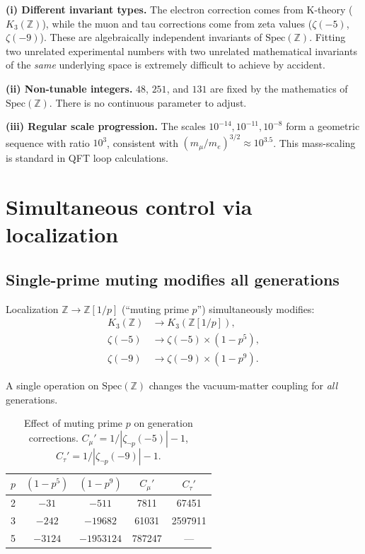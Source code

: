 \documentclass[11pt,a4paper]{article}
\newcommand{\Spec}{\mathrm{Spec}}
\begin{document}
\textbf{(i) Different invariant types.} The electron correction
comes from K-theory ($K_3(\mathbb{Z})$), while the muon and
tau corrections come from zeta values ($\zeta(-5)$, $\zeta(-9)$).
These are algebraically independent invariants of $\Spec(\mathbb{Z})$.
Fitting two unrelated experimental numbers with two unrelated
mathematical invariants of the \emph{same} underlying space is
extremely difficult to achieve by accident.

\textbf{(ii) Non-tunable integers.} $48$, $251$, and $131$ are
fixed by the mathematics of $\Spec(\mathbb{Z})$. There is no
continuous parameter to adjust.

\textbf{(iii) Regular scale progression.} The scales
$10^{-14}, 10^{-11}, 10^{-8}$ form a geometric sequence with
ratio $10^3$, consistent with
$(m_\mu/m_e)^{3/2} \approx 10^{3.5}$.
This mass-scaling is standard in QFT loop calculations.

\section{Simultaneous control via localization}
\label{sec:localization}

\subsection{Single-prime muting modifies all generations}

Localization $\mathbb{Z} \to \mathbb{Z}[1/p]$
(``muting prime $p$'') simultaneously modifies:
\begin{align}
  K_3(\mathbb{Z}) &\to K_3(\mathbb{Z}[1/p]), \\
  \zeta(-5) &\to \zeta(-5) \times (1 - p^5), \\
  \zeta(-9) &\to \zeta(-9) \times (1 - p^9).
\end{align}

A single operation on $\Spec(\mathbb{Z})$ changes the
vacuum-matter coupling for \emph{all} generations.

\begin{table}[h]
\centering
\caption{Effect of muting prime $p$ on generation corrections.
$C_\mu' = 1/|\zeta_{\neg p}(-5)| - 1$,
$C_\tau' = 1/|\zeta_{\neg p}(-9)| - 1$.}
\label{tab:muting}
\small
\begin{tabular}{@{}ccccc@{}}
\toprule
$p$ & $(1-p^5)$ & $(1-p^9)$ & $C_\mu'$ & $C_\tau'$ \\
\midrule
2 & $-31$ & $-511$ & 7811 & 67451 \\
3 & $-242$ & $-19682$ & 61031 & 2597911 \\
5 & $-3124$ & $-1953124$ & 787247 & --- \\
\bottomrule
\end{tabular}
\end{table}
\end{document}
